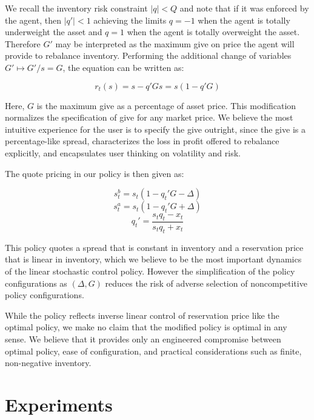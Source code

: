 \documentclass{article}
\begin{document}
We recall the inventory risk constraint $|q| < Q$ and note that if it was enforced by the agent, then $|q'| < 1$ achieving the limits $q = -1$ when the agent is totally underweight the asset and $q = 1$ when the agent is totally overweight the asset. Therefore $G'$ may be interpreted as the maximum give on price the agent will provide to rebalance inventory. Performing the additional change of variables $G' \mapsto G'/s = G$, the equation can be written as:

\begin{equation}
\label{eq:retailpricepercentage}
r_t(s) = s - q' G s = s (1 - q' G)
\end{equation}

Here, $G$ is the maximum give as a percentage of asset price. This modification normalizes the specification of give for any market price. We believe the most intuitive experience for the user is to specify the give outright, since the give is a percentage-like spread, characterizes the loss in profit offered to rebalance explicitly, and encapsulates user thinking on volatility and risk.

The quote pricing in our policy is then given as:

\begin{equation}
\label{eq:retailbid}
s^b_t = s_t (1 - q_t' G - \Delta)
\end{equation}
\begin{equation}
\label{eq:retailask}
s^a_t = s_t (1 - q_t' G + \Delta)
\end{equation}
\begin{equation}
\label{eq:retailqprime}
q_t' = \frac{s_t q_t - x_t}{s_t q_t + x_t}
\end{equation}

This policy quotes a spread that is constant in inventory and a reservation price that is linear in inventory, which we believe to be the most important dynamics of the linear stochastic control policy. However the simplification of the policy configurations as $(\Delta, G)$ reduces the risk of adverse selection of noncompetitive policy configurations.

While the policy reflects inverse linear control of reservation price like the optimal policy, we make no claim that the modified policy is optimal in any sense. We believe that it provides only an engineered compromise between optimal policy, ease of configuration, and practical considerations such as finite, non-negative inventory.

\section{Experiments}
\label{sec:experiments}
\end{document}
